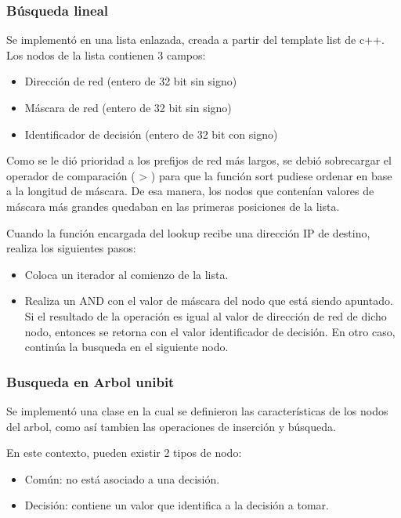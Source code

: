 \subsubsection {Búsqueda lineal}

Se implementó en una lista enlazada, creada a partir del template list de c++. Los nodos de la lista contienen 3 campos:

\begin{itemize}
	\item Dirección de red (entero de 32 bit sin signo)
	\item Máscara de red (entero de 32 bit sin signo)
	\item Identificador de decisión (entero de 32 bit con signo)
\end{itemize}

Como se le dió prioridad a los prefijos de red más largos, se debió sobrecargar el operador de comparación ( > ) para que la función sort pudiese ordenar en base a la longitud de máscara. De esa manera, los nodos que contenían valores de máscara más grandes quedaban en las primeras posiciones de la lista.

Cuando la función encargada del lookup recibe una dirección IP de destino, realiza los siguientes pasos:

\begin{itemize}
	\item Coloca un iterador al comienzo de la lista.
	\item Realiza un AND con el valor de máscara del nodo que está siendo apuntado. Si el resultado de la operación es igual al valor de dirección de red de dicho nodo, entonces se retorna con el valor identificador de decisión. En otro caso, continúa la busqueda en el siguiente nodo.
\end{itemize}

\subsubsection {Busqueda en Arbol unibit}

Se implementó una clase en la cual se definieron las características de los nodos del arbol, como así tambien las operaciones de inserción y búsqueda.

En este contexto, pueden existir 2 tipos de nodo:

\begin{itemize}
	\item Común: no está asociado a una decisión.
	\item Decisión: contiene un valor que identifica a la decisión a tomar. 
\end{itemize}

